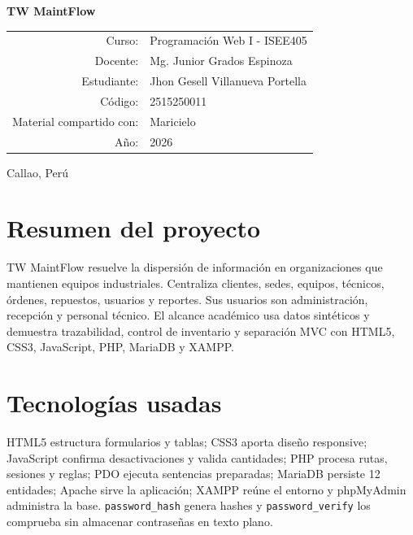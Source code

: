 \documentclass[11pt,a4paper]{report}
\begin{document}
\begin{titlepage}\pagecolor{navy}\color{white}\centering\vspace*{1.2cm}{\Large UNIVERSIDAD NACIONAL DEL CALLAO\par}\vspace{.4cm}{\large Facultad de Ingeniería Industrial y de Sistemas\par Escuela Profesional de Ingeniería de Sistemas\par}\vfill{\Huge\bfseries TW MaintFlow\par}\vspace{.5cm}{\Large Sistema web MVC para gestión de mantenimiento y órdenes de servicio\par}\vfill\begin{tabular}{rl}Curso:&Programación Web I - ISEE405\\Docente:&Mg. Junior Grados Espinoza\\Estudiante:&Jhon Gesell Villanueva Portella\\Código:&2515250011\\Material compartido con:&Maricielo\\Año:&2026\end{tabular}\vfill{\large Callao, Perú\par}\end{titlepage}\nopagecolor\color{black}
\tableofcontents\listoffigures\listoftables
\chapter{Resumen del proyecto}
TW MaintFlow resuelve la dispersión de información en organizaciones que mantienen equipos industriales. Centraliza clientes, sedes, equipos, técnicos, órdenes, repuestos, usuarios y reportes. Sus usuarios son administración, recepción y personal técnico. El alcance académico usa datos sintéticos y demuestra trazabilidad, control de inventario y separación MVC con HTML5, CSS3, JavaScript, PHP, MariaDB y XAMPP.
\chapter{Tecnologías usadas}
HTML5 estructura formularios y tablas; CSS3 aporta diseño responsive; JavaScript confirma desactivaciones y valida cantidades; PHP procesa rutas, sesiones y reglas; PDO ejecuta sentencias preparadas; MariaDB persiste 12 entidades; Apache sirve la aplicación; XAMPP reúne el entorno y phpMyAdmin administra la base. \texttt{password\_hash} genera hashes y \texttt{password\_verify} los comprueba sin almacenar contraseñas en texto plano.
\end{document}
